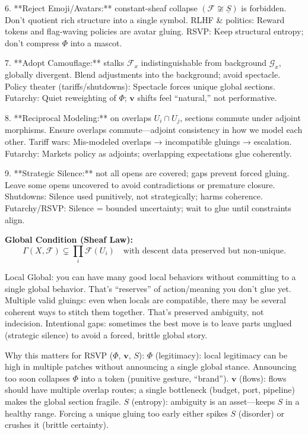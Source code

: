 \documentclass{article}
\newcommand{\lr}{\leftrightarrow}
\newcommand{\neqsym}{\neq}
\newcommand{\lr}{\leftrightarrow}
\newcommand{\neqsym}{\neq}
\begin{document}
6. **Reject Emoji/Avatars:** constant-sheaf collapse 
   $(\mathcal{F} \not\cong \underline{S})$ is forbidden. Don’t quotient rich structure into a single symbol. RLHF \& politics: Reward tokens and flag-waving policies are avatar gluing. RSVP: Keep structural entropy; don’t compress $\Phi$ into a mascot.
   
7. **Adopt Camouflage:** stalks $\mathcal{F}_x$ indistinguishable from 
   background $\mathcal{G}_x$, globally divergent. Blend adjustments into the background; avoid spectacle. Policy theater (tariffs/shutdowns): Spectacle forces unique global sections. Futarchy: Quiet reweighting of $\Phi$; $\mathbf{v}$ shifts feel “natural,” not performative.
   
8. **Reciprocal Modeling:** on overlaps $U_i\cap U_j$, sections commute under 
   adjoint morphisms. Ensure overlaps commute—adjoint consistency in how we model each other. Tariff wars: Mis-modeled overlaps → incompatible gluings → escalation. Futarchy: Markets \lr policy as adjoints; overlapping expectations glue coherently.
   
9. **Strategic Silence:** not all opens are covered; gaps prevent forced 
   gluing. Leave some opens uncovered to avoid contradictions or premature closure. Shutdowns: Silence used punitively, not strategically; harms coherence. Futarchy/RSVP: Silence = bounded uncertainty; wait to glue until constraints align.

\textbf{Global Condition (Sheaf Law):}
\[
\Gamma(X,\mathcal{F}) \subsetneq \prod_{i} \mathcal{F}(U_i) 
\quad \text{with descent data preserved but non-unique.}
\]

Local \neqsym Global: you can have many good local behaviors without committing to a single global behavior. That’s “reserves” of action/meaning you don’t glue yet. Multiple valid gluings: even when locals are compatible, there may be several coherent ways to stitch them together. That’s preserved ambiguity, not indecision. Intentional gaps: sometimes the best move is to leave parts unglued (strategic silence) to avoid a forced, brittle global story.

Why this matters for RSVP ($\Phi$, $\mathbf{v}$, $S$): $\Phi$ (legitimacy): local legitimacy can be high in multiple patches without announcing a single global stance. Announcing too soon collapses $\Phi$ into a token (punitive gesture, “brand”). $\mathbf{v}$ (flows): flows should have multiple overlap routes; a single bottleneck (budget, port, pipeline) makes the global section fragile. $S$ (entropy): ambiguity is an asset—keeps $S$ in a healthy range. Forcing a unique gluing too early either spikes $S$ (disorder) or crushes it (brittle certainty).
\end{document}

